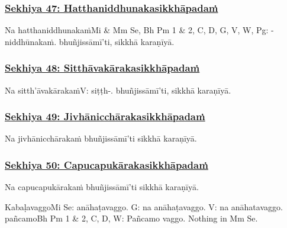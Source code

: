 \subsubsection*{\hyperref[training47]{Sekhiya 47: Hatthaniddhunakasikkhāpadaṁ}}
\label{sekh47}

Na hatthaniddhunakaṁ\makeatletter\hyperlink{endnote-appendix}\makeatother Mi & Mm Se, Bh Pm 1 & 2, C, D, G, V, W, Pg: -niddhūnakaṁ. bhuñjissāmī'ti, sikkhā karaṇīyā.



\subsubsection*{\hyperref[training48]{Sekhiya 48: Sitthāvakārakasikkhāpadaṁ}}
\label{sekh48}

Na sitth'āvakārakaṁ\makeatletter\hyperlink{endnote-appendix}\makeatother V: siṭṭh-. bhuñjissāmī'ti, sikkhā karaṇīyā.



\subsubsection*{\hyperref[training49]{Sekhiya 49: Jivhānicchārakasikkhāpadaṁ}}
\label{sekh49}

Na jivhānicchārakaṁ bhuñjissāmī'ti sikkhā karaṇīyā.



\subsubsection*{\hyperref[training50]{Sekhiya 50: Capucapukārakasikkhāpadaṁ}}
\label{sekh50}

Na capucapukārakaṁ bhuñjissāmī'ti sikkhā karaṇīyā.

\begin{center}
	Kabaḷavaggo\makeatletter\hyperlink{endnote-appendix}\makeatother Mi Se: anāhaṭavaggo. G: na anāhaṭavaggo. V: na anāhatavaggo. pañcamo\makeatletter\hyperlink{endnote-appendix}\makeatother Bh Pm 1 & 2, C, D, W: Pañcamo vaggo. Nothing in Mm Se.
\end{center}



